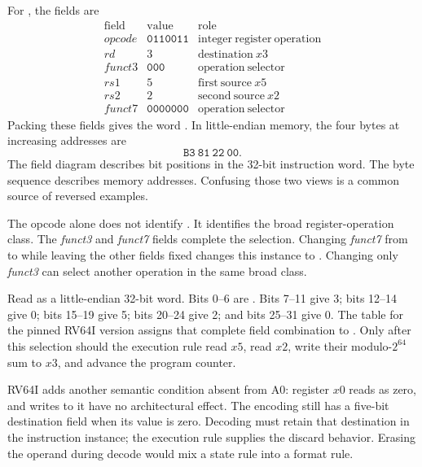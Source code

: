 For , the fields are
\[
\begin{array}{c|c|c}
\mathrm{field} & \mathrm{value} & \mathrm{role}\\ \hline
\mathit{opcode} & \mathtt{0110011} & \mathrm{integer\ register\ operation}\\
\mathit{rd} & 3 & \mathrm{destination}\ x3\\
\mathit{funct3} & \mathtt{000} & \mathrm{operation\ selector}\\
\mathit{rs1} & 5 & \mathrm{first\ source}\ x5\\
\mathit{rs2} & 2 & \mathrm{second\ source}\ x2\\
\mathit{funct7} & \mathtt{0000000} & \mathrm{operation\ selector}
\end{array}
\]
Packing these fields gives the word . In little-endian memory,
the four bytes at increasing addresses are
\[
  \mathtt{B3\ 81\ 22\ 00}.
\]
The field diagram describes bit positions in the 32-bit instruction word. The
byte sequence describes memory addresses. Confusing those two views is a
common source of reversed examples.

The opcode alone does not identify . It identifies the broad
register-operation class. The \textit{funct3} and \textit{funct7} fields
complete the selection. Changing \textit{funct7} from  to
 while leaving the other fields fixed changes this instance to
. Changing only \textit{funct3} can select another
operation in the same broad class.

\begin{example}[title={Decode from bytes without reading the mnemonic}]
Read  as a little-endian 32-bit word. Bits 0--6 are
. Bits 7--11 give 3; bits 12--14 give 0; bits 15--19 give 5;
bits 20--24 give 2; and bits 25--31 give 0. The table for the pinned RV64I
version assigns that complete field combination to .
Only after this selection should the execution rule read \(x5\), read \(x2\),
write their modulo-\(2^{64}\) sum to \(x3\), and advance the program counter.
\end{example}

RV64I adds another semantic condition absent from A0: register \(x0\) reads as
zero, and writes to it have no architectural effect. The encoding still has a
five-bit destination field when its value is zero. Decoding
 must retain that destination in the instruction instance;
the execution rule supplies the discard behavior. Erasing the operand during
decode would mix a state rule into a format rule.

